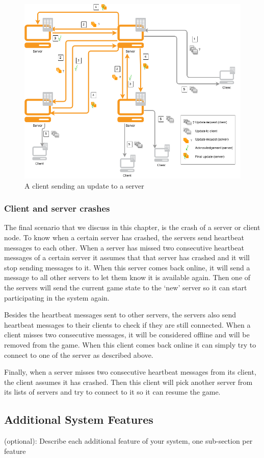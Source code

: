 \begin{figure}[h!]
  \centering
    \includegraphics[width=\textwidth]{diagrams/game-update}
    
  \caption{A client sending an update to a server}
  \label{update_diagram}
\end{figure}

\subsubsection*{Client and server crashes}
The final scenario that we discuss in this chapter, is the crash of a server or client node. To know when a certain server has crashed, the servers send heartbeat messages to each other. When a server has missed two consecutive heartbeat messages of a certain server it assumes that that server has crashed and it will stop sending messages to it. When this server comes back online, it will send a message to all other servers to let them know it is available again. Then one of the servers will send the current game state to the `new' server so it can start participating in the system again. 

Besides the heartbeat messages sent to other servers, the servers also send heartbeat messages to their clients to check if they are still connected. When a client misses two consecutive messages, it will be considered offline and will be removed from the game. When this client comes back online it can simply try to connect to one of the server as described above.

Finally, when a server misses two consecutive heartbeat messages from its client, the client assumes it has crashed. Then this client will pick another server from its lists of servers and try to connect to it so it can resume the game.

\subsection{Additional System Features}
(optional): Describe each additional feature of your system, one sub-section per feature
 

